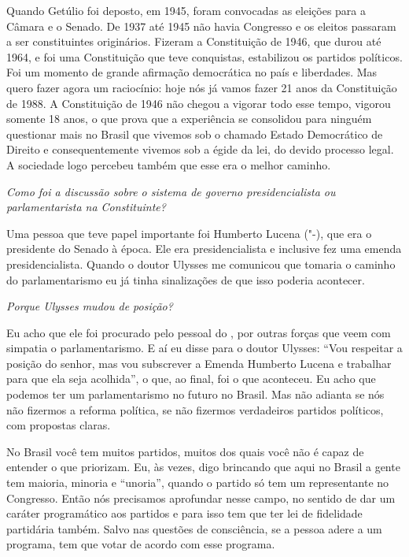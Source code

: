 Quando Getúlio foi deposto, em 1945, foram convocadas as eleições para a
Câmara e o Senado. De 1937 até 1945 não havia Congresso e os eleitos
passaram a ser constituintes originários. Fizeram a Constituição de
1946, que durou até 1964, e foi uma Constituição que teve conquistas,
estabilizou os partidos políticos. Foi um momento de grande afirmação
democrática no país e liberdades. Mas quero fazer agora um raciocínio:
hoje nós já vamos fazer 21 anos da Constituição de 1988. A Constituição
de 1946 não chegou a vigorar todo esse tempo, vigorou somente 18 anos, o
que prova que a experiência se consolidou para ninguém questionar mais
no Brasil que vivemos sob o chamado Estado Democrático de Direito e
consequentemente vivemos sob a égide da lei, do devido processo legal. A
sociedade logo percebeu também que esse era o melhor caminho.

\medskip

\noindent\emph{Como foi a discussão sobre o sistema de governo presidencialista
ou parlamentarista na Constituinte?}

Uma pessoa que teve papel importante foi Humberto
Lucena ("-), que era o presidente do Senado à época. Ele era
presidencialista e inclusive fez uma emenda presidencialista. Quando o
doutor Ulysses me comunicou que tomaria o caminho do parlamentarismo eu
já tinha sinalizações de que isso poderia acontecer.

\medskip

\noindent\emph{Porque Ulysses mudou de posição?}

Eu acho que ele foi procurado pelo pessoal do , por
outras forças que veem com simpatia o parlamentarismo. E aí eu disse
para o doutor Ulysses: ``Vou respeitar a posição do senhor, mas vou
subscrever a Emenda Humberto Lucena e trabalhar para que ela seja
acolhida'', o que, ao final, foi o que aconteceu. Eu acho que podemos
ter um parlamentarismo no futuro no Brasil. Mas não adianta se nós não
fizermos a reforma política, se não fizermos verdadeiros partidos
políticos, com propostas claras.

No Brasil você tem muitos partidos, muitos dos quais você não é capaz de
entender o que priorizam. Eu, às vezes, digo brincando que aqui no
Brasil a gente tem maioria, minoria e ``unoria'', quando o partido só
tem um representante no Congresso. Então nós precisamos aprofundar nesse
campo, no sentido de dar um caráter programático aos partidos e para
isso tem que ter lei de fidelidade partidária também. Salvo nas questões
de consciência, se a pessoa adere a um programa, tem que votar de acordo
com esse programa.

